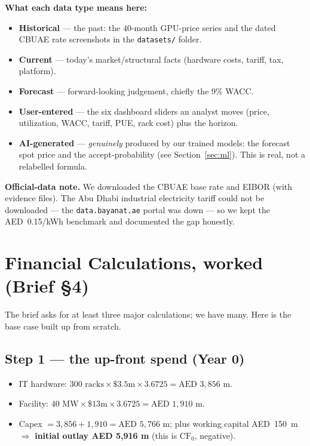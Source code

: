 \documentclass[11pt,a4paper]{article}
\begin{document}
\textbf{What each data type means here:}
\begin{itemize}
  \item \textbf{Historical} --- the past: the 40-month GPU-price series and the dated CBUAE rate
  screenshots in the \texttt{datasets/} folder.
  \item \textbf{Current} --- today's market/structural facts (hardware costs, tariff, tax, platform).
  \item \textbf{Forecast} --- forward-looking judgement, chiefly the 9\% WACC.
  \item \textbf{User-entered} --- the six dashboard sliders an analyst moves (price, utilization,
  WACC, tariff, PUE, rack cost) plus the horizon.
  \item \textbf{AI-generated} --- \emph{genuinely} produced by our trained models: the forecast spot
  price and the accept-probability (see Section~\ref{sec:ml}). This is real, not a relabelled formula.
\end{itemize}

\textbf{Official-data note.} We downloaded the CBUAE base rate and EIBOR (with evidence files). The
Abu Dhabi industrial electricity tariff could not be downloaded --- the \texttt{data.bayanat.ae}
portal was down --- so we kept the AED~0.15/kWh benchmark and documented the gap honestly.

\section{Financial Calculations, worked (Brief \S4)}
The brief asks for at least three major calculations; we have many. Here is the base case built up
from scratch.

\subsection{Step 1 --- the up-front spend (Year 0)}
\begin{itemize}
  \item IT hardware: $300\text{ racks}\times\$3.5\text{m}\times3.6725 = \text{AED }3{,}856\text{ m}$.
  \item Facility: $40\text{ MW}\times\$13\text{m}\times3.6725 = \text{AED }1{,}910\text{ m}$.
  \item Capex $=3{,}856+1{,}910=\text{AED }5{,}766\text{ m}$; plus working capital AED~150~m
  $\Rightarrow$ \textbf{initial outlay AED 5{,}916 m} (this is $\text{CF}_0$, negative).
\end{itemize}
\end{document}
